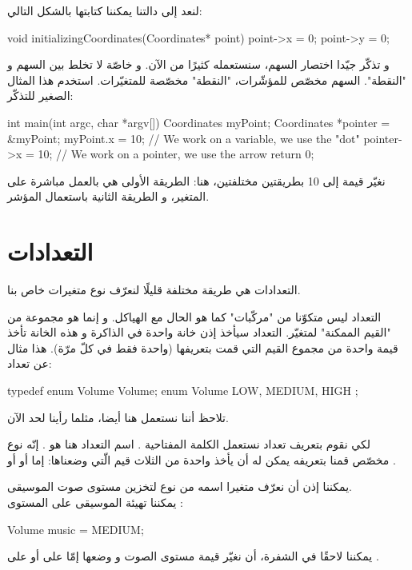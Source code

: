 لنعد إلى دالتنا
يمكننا كتابتها بالشكل التالي:

\begin{Csource}
void initializingCoordinates(Coordinates* point)
{
	point->x = 0;
	point->y = 0;
}
\end{Csource}

و تذكّر جيّدا اختصار السهم، سنستعمله كثيرًا من الآن. و خاصّة لا تخلط بين السهم و "النقطة". السهم مخصّص للمؤشّرات، "النقطة" مخصّصة للمتغيّرات. استخدم هذا المثال الصغير للتذكّر:

\begin{Csource}
int main(int argc, char *argv[])
{
	Coordinates  myPoint;
	Coordinates *pointer = &myPoint;
	myPoint.x = 10; // We work on a variable, we use the "dot"
	pointer->x = 10; // We work on a pointer, we use the arrow
	return 0;
}
\end{Csource}

نغيّر قيمة
إلى 10 بطريقتين مختلفتين، هنا: الطريقة الأولى هي بالعمل مباشرة على المتغير، و الطريقة الثانية باستعمال المؤشر.

\section{التعدادات}

التعدادات هي طريقة مختلفة قليلًا لنعرّف نوع متغيرات خاص بنا.

التعداد ليس متكوّنا من "مركّبات"  كما هو الحال مع الهياكل. و إنما هو مجموعة من "القيم الممكنة" لمتغيّر. التعداد سيأخذ إذن خانة واحدة في الذاكرة و هذه الخانة تأخذ قيمة واحدة من مجموع القيم التي قمت بتعريفها (واحدة فقط في كلّ مرّة).
هذا مثال عن تعداد:
\begin{Csource}
typedef enum Volume Volume;
enum Volume
{
	LOW, MEDIUM, HIGH
};
\end{Csource}
تلاحظ أننا نستعمل
هنا أيضا، مثلما رأينا لحد الآن.

لكي نقوم بتعريف تعداد نستعمل الكلمة المفتاحية
.
اسم التعداد هنا هو
.
إنّه نوع مخصّص قمنا بتعريفه يمكن له أن يأخذ واحدة من الثلاث قيم الّتي وضعناها: إما
أو
أو
.

يمكننا إذن أن نعرّف متغيرا اسمه
من نوع
لتخزين مستوى صوت الموسيقى.\\
يمكننا تهيئة الموسيقى على المستوى
:
\begin{Csource}
Volume music = MEDIUM;
\end{Csource}
يمكننا لاحقًا في الشفرة، أن نغيّر قيمة مستوى الصوت و وضعها إمّا على
أو على
.

